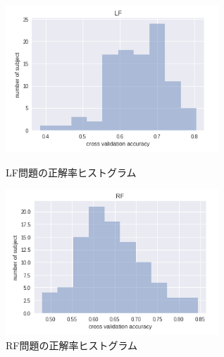 \begin{figure}[t]
    \begin{minipage}{0.5\hsize}
     \begin{center}
      \includegraphics[width=80mm]{images/LF.png}
     \end{center}
     \caption{LF問題の正解率ヒストグラム}
     \label{fig:LFhist}
    \end{minipage}
    \begin{minipage}{0.5\hsize}
     \begin{center}
      \includegraphics[width=80mm]{images/RF.png}
     \end{center}
     \caption{RF問題の正解率ヒストグラム}
     \label{fig:RFhist}
    \end{minipage}
\end{figure}

